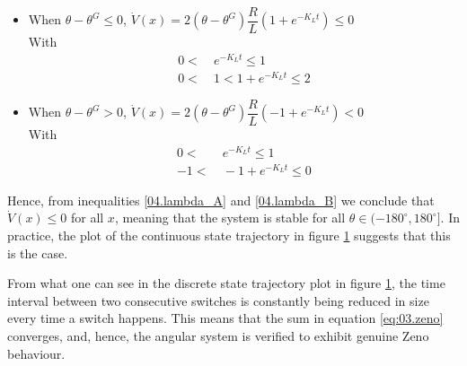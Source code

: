 \begin{itemize}
  \item When $\theta - \theta^G \leq 0$, $\dot{V}(x) = 2 (\theta - \theta^G) \dfrac{R}{L} (1 + e^{-K_L t}) \leq 0$ \\
    With
    \begin{align}
      0 <&\ e^{-K_L t} \leq 1 \nonumber \\
      0 <&\ 1 < 1 + e^{-K_L t} \leq 2 \label{04.lambda_A}
    \end{align}
  \item When $\theta - \theta^G > 0$, $\dot{V}(x) = 2 (\theta - \theta^G) \dfrac{R}{L} (-1 + e^{-K_L t}) < 0$  \\
    With
    \begin{align}
      0 <&\ e^{-K_L t} \leq 1 \nonumber \\
      -1 <&\ -1 + e^{-K_L t} \leq 0 \label{04.lambda_B}
    \end{align}
\end{itemize}


Hence, from inequalities \ref{04.lambda_A} and \ref{04.lambda_B} we conclude
that $\dot{V}(x) \leq 0$ for all $x$, meaning that the system is stable for all
$\theta \in (-180^{\circ}, 180^{\circ}]$. In practice, the plot of the
continuous state trajectory in figure \ref{fig:04} suggests that this is the
case.

From what one can see in the discrete state trajectory plot in
figure \ref{fig:04}, the time interval between two consecutive switches is
constantly being reduced in size every time a switch happens. This means that
the sum in equation \ref{eq:03.zeno} converges, and, hence, the angular system
is verified to exhibit genuine Zeno behaviour.

\begin{figure}[H]\centering
  \scalebox{0.9}{}
  \caption{}
  \label{fig:04}
\end{figure}
